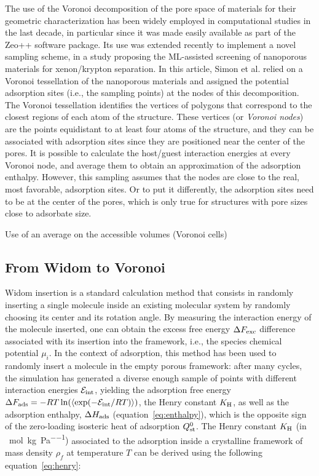 \documentclass[main]{subfiles}
\begin{document}
The use of the Voronoi decomposition of the pore space of materials for their geometric characterization has been widely employed in computational studies in the last decade,\cite{Willems_2012} in particular since it was made easily available as part of the Zeo++ software package.\cite{Pinheiro2013} Its use was extended recently to implement a novel sampling scheme, in a study proposing the ML-assisted screening of nanoporous materials for xenon/krypton separation. In this article, Simon et al.\cite{Simon_2015} relied on a Voronoi tessellation of the nanoporous materials and assigned the potential adsorption sites (i.e., the sampling points) at the nodes of this decomposition. The Voronoi tessellation identifies the vertices of polygons that correspond to the closest regions of each atom of the structure. These vertices (or \emph{Voronoi nodes}) are the points equidistant to at least four atoms of the structure, and they can be associated with adsorption sites since they are positioned near the center of the pores. It is possible to calculate the host/guest interaction energies at every Voronoi node, and average them to obtain an approximation of the adsorption enthalpy. However, this sampling assumes that the nodes are close to the real, most favorable, adsorption sites. Or to put it differently, the adsorption sites need to be at the center of the pores, which is only true for structures with pore sizes close to adsorbate size.


Use of an average on the accessible volumes (Voronoi cells)

\subsection{From Widom to Voronoi}

Widom insertion is a standard calculation method that consists in randomly inserting a single molecule inside an existing molecular system {by randomly choosing its center and its rotation angle}.\cite{Widom1963} 
By measuring the interaction energy of the molecule inserted, one can obtain the excess free energy $\Delta F_{\text{exc}}$ difference associated with its insertion {into the framework}, i.e., the species chemical potential $\mu_i$. In the context of adsorption, this method has been used to randomly insert a molecule in the empty porous framework: after many cycles, the simulation has generated a diverse enough sample of points with different interaction energies $\mathcal{E}_{\text{int}}$, yielding the adsorption free energy $\Delta F_{\text{ads}} = -RT \ln(\langle \exp(- \mathcal{E}_{\text{int}}/RT) \rangle)$, the Henry constant $K_{\text{H}}$, as well as the adsorption enthalpy, $\Delta H_{\text{ads}}$ (equation~\ref{eq:enthalpy}), which is the opposite {sign} of the zero-loading isosteric heat of adsorption $Q_{\text{st}}^0$. The Henry constant\cite{June_1990,KAR2001,Sarkisov_2020} $K_{\text{H}}$ {(in \SI{}{\mole\per\kilo\gram\per\pascal})} associated to the adsorption inside a crystalline framework of mass density $\rho_f$ at temperature $T$ can be derived using the following equation~\ref{eq:henry}:
\end{document}
